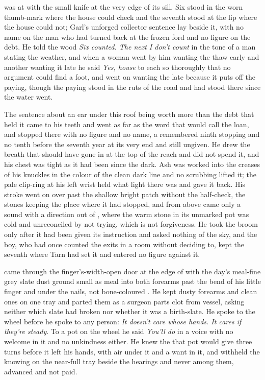 \scenebreak

 was at  with the small knife at the very edge of its sill. Six stood in the worn thumb-mark where the house could check and the seventh stood at the lip where the house could not; Garl's unforged collector sentence lay beside it, with no name on the man who had turned back at the frozen ford and no figure on the debt. He told the wood \emph{Six counted. The next I don't count} in the tone of a man stating the weather, and when a woman went by him wanting the thaw early and another wanting it late he said \emph{Yes, house} to each so thoroughly that no argument could find a foot, and went on wanting the late because it puts off the paying, though the paying stood in the ruts of the road and had stood there since the water went.

The sentence about an ear under this roof being worth more than the debt that held it came to his teeth and went as far as the word that would call the loan, and stopped there with no figure and no name, a remembered ninth stopping and no tenth before the seventh year at its very end and still ungiven. He drew the breath that should have gone in at the top of the reach and did not spend it, and his chest was tight as it had been since the dark. Ash was worked into the creases of his knuckles in the colour of the clean dark line and no scrubbing lifted it; the pale clip-ring at his left wrist held what light there was and gave it back. His stroke went on over  past the shallow bright patch without the half-check, the stones keeping the place where it had stopped, and from above came only a sound with a direction out of , where the warm stone in its unmarked pot was cold and unreconciled by not trying, which is not forgiveness. He took the broom only after it had been given its instruction and asked nothing of the sky, and the boy, who had once counted the exits in a room without deciding to, kept the seventh where Tarn had set it and entered no figure against it.

\scenebreak

 came through the finger's-width-open door at the edge of  with the day's meal-fine grey slate dust ground small as meal into both forearms past the bend of his little finger and under the nails, not bone-coloured . He kept dusty forearms and clean ones on one tray and parted them as a surgeon parts clot from vessel, asking neither which slate had broken nor whether it was a birth-slate. He spoke to the wheel before he spoke to any person: \emph{It doesn't care whose hands. It cares if they're steady}. To a pot on the wheel he said \emph{You'll do} in a voice with no welcome in it and no unkindness either. He knew the  that pot would give three turns before it left his hands, with air under it and a want in it, and withheld the knowing on the near-full tray beside the hearings and never among them, advanced and not paid.

